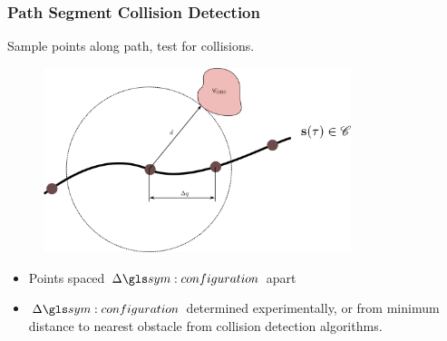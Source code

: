 \documentclass{beamer}
\begin{document}
	\begin{frame}
		\frametitle{Path Segment Collision Detection}

		Sample points along path, test for collisions.

		\begin{figure}
			\includegraphics[width=0.8\textwidth]{path_collision_detection.png}
		\end{figure}

		\begin{itemize}

			\item

				Points spaced $\Delta \configuration$ apart

			\item

				$\Delta\configuration$ determined experimentally, or from
				minimum distance to nearest obstacle from collision detection
				algorithms.

		\end{itemize}
	\end{frame}
\end{document}
